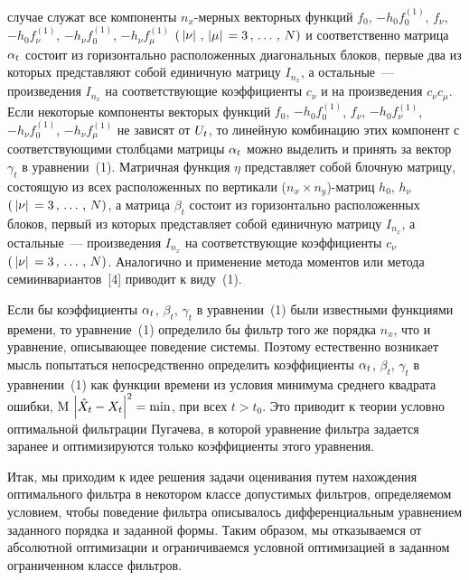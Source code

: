 \begin{multicols}{2}
случае служат все компоненты  ${n_x}$-мерных векторных функций
$f_0$,  $-h_0 f_0^{(1)}$, $f_\nu$,  $-h_0 f_\nu^{(1)}$, $-h_\nu f_0^{(1)}$,
 $-h_\nu f_\mu^{(1)}$ $(\,\left\vert\nu\right\vert\,, \,\left\vert\mu\right\vert\, =
3\,,\,\ldots\,,\, N)$ и соответственно матрица  $\alpha_t$ состоит из
горизонтально расположенных диагональных блоков, первые два из
которых представляют собой единичную матрицу  $I_{n_x}$, а
остальные~--- произведения  $I_{n_x}$ на соответствующие
коэффициенты $c_\nu$ и на произведения  $c_\nu c_\mu$. Если
некоторые компоненты векторых функций $f_0$,  $-h_0 f_0^{(1)}$,
$f_\nu$,  $-h_0 f_\nu^{(1)}$,  $-h_\nu f_0^{(1)}$,  $-h_\nu f_\mu^{(1)}$
не зависят от $U_t$, то линейную комбинацию этих
компонент с соответствующими столбцами матрицы  $\alpha_t$ можно
выделить и принять за вектор  $\gamma_t$ в уравнении~(1). Матричная функция
$\eta$ представляет собой блочную матрицу, состоящую из всех
расположенных по вертикали  (${n_x}\times n_y$)-матриц $h_0$,
$h_\nu$ $(\,\left\vert\nu\right\vert\, = 3\,,\,\ldots\,,\, N)$, а матрица $\beta_t$ состоит из
горизонтально расположенных блоков, первый из которых представляет
собой единичную матрицу  $I_{n_x}$, а остальные~---   произведения
$I_{n_x}$ на соответствующие коэффициенты  $c_\nu$ $(\,\left\vert \nu\right\vert\, =
3\,,\,\ldots\,,\, N)$. Аналогично и применение метода моментов или метода
семиинвариантов~[4] приводит к виду~(1).

Если бы коэффициенты  $\alpha_t$, $\beta_t$, $\gamma_t$ в уравнении~(1) были
известными функциями времени, то уравнение~(1) определило бы
фильтр того же  порядка  ${n_x}$, что и уравнение, описывающее
поведение системы. Поэтому естественно возникает мысль попытаться
непосредственно определить коэффициенты $\alpha_t$, $\beta_t$,
$\gamma_t$ в уравнении~(1) как функции времени из условия минимума
среднего квадрата ошибки,  ${\rm M}\,\left\vert \hat X_t - X_t\right\vert^2
=\min$, при всех  $t>t_0$. Это приводит к теории условно
оптимальной фильтрации Пугачева, в которой уравнение фильтра
задается заранее и оптимизируются только коэффициенты этого
уравнения.

Итак, мы приходим к идее решения задачи оценивания путем
нахождения оптимального фильтра в некотором классе допустимых
фильтров, определяемом условием, чтобы поведение фильтра
описывалось дифференциальным уравнением заданного порядка и
заданной формы. Таким образом, мы отказываемся от абсолютной
оптимизации и ограничиваемся условной оптимизацией в заданном
ограниченном классе фильтров.


\end{multicols}
